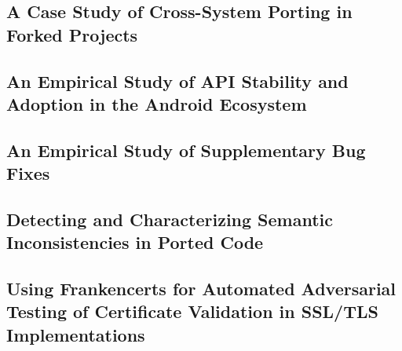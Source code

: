 \documentclass[a4paper, 10pt]{article}
\begin{document}
\begin{small}
\begin{itemize}
\end{itemize}







%
%
%


\subsection*{A Case Study of Cross-System Porting in Forked Projects}

\subsection*{An Empirical Study of API Stability and Adoption in the Android Ecosystem}

\subsection*{An Empirical Study of Supplementary Bug Fixes}

\subsection*{Detecting and Characterizing Semantic Inconsistencies in Ported Code}

\subsection*{Using Frankencerts for Automated Adversarial Testing of Certificate Validation in SSL/TLS Implementations}

\vspace{0.5cm}


\end{small}
\begin{footnotesize}


\end{footnotesize}
\end{document}
